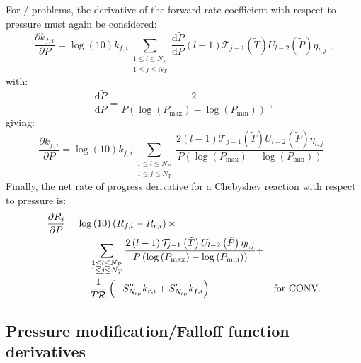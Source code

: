 \documentclass[12pt,number,sort&compress]{elsarticle}
\begin{document}
For \conv/ problems, the derivative of the forward rate coefficient with respect to pressure must again be considered:
\begin{equation}
 \frac{\partial {k_{f, i}} }{\partial P } = \log{\left (10 \right )} {k_{f, i}} \sum_{\substack{1 \leq l \leq N_{P}\\1 \leq j \leq N_{T}}} \frac{\text{d} \tilde{P} }{\text{d} P } \left(l - 1\right) \mathcal{T}_{j - 1}\left(\tilde{T}\right) U_{l - 2}\left(\tilde{P}\right) \eta_{l,j}\;,
\end{equation}
with:
\begin{equation}
 \frac{\text{d} \tilde{P} }{\text{d} P } = \frac{2}{P \left(\log{\left (P_{\max} \right )} - \log{\left (P_{\min} \right )}\right)}\;,
\end{equation}
giving:
\begin{equation}
 \frac{\partial {k_{f, i}} }{\partial P } = \log{\left (10 \right )} {k_{f, i}} \sum_{\substack{1 \leq l \leq N_{P}\\1 \leq j \leq N_{T}}} \frac{2 \left(l - 1\right) \mathcal{T}_{j - 1}\left(\tilde{T}\right) U_{l - 2}\left(\tilde{P}\right) \eta_{l,j}}{P \left(\log{\left (P_{\max} \right )} - \log{\left (P_{\min} \right )}\right)}\;.
\end{equation}
Finally, the net rate of progress derivative for a Chebyshev reaction with respect to pressure is:
\begin{align}
 \label{e:dropi_cheb_de}
 \frac{\partial R_{i} }{\partial P } &= \log{\left (10 \right )} \left({R_{f, i}} - {R_{r, i}}\right) \times &\nonumber \\
				     & \mathindent \sum_{\substack{1 \leq l \leq N_{P}\\1 \leq j \leq N_{T}}} \frac{2 \left(l - 1\right) \mathcal{T}_{j - 1}\left(\tilde{T}\right) U_{l - 2}\left(\tilde{P}\right) \eta_{l,j}}{P \left(\log{\left (P_{\max} \right )} - \log{\left (P_{\min} \right )}\right)} + & \nonumber \\
				     & \mathindent \frac{1}{T \Ru/} \left(- S^{\prime\prime}_{\ns/} {k_{r, i}} + S^{\prime}_{\ns/} {k_{f, i}}\right) & \text{\dconv/.}
\end{align}



\subsection{Pressure modification\slash Falloff function derivatives}
\label{s:dci}
\end{document}

